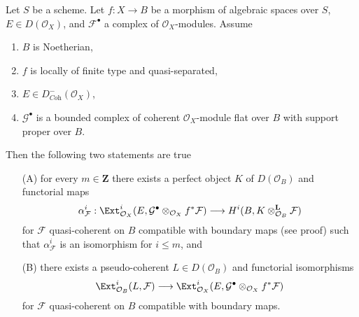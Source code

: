 \begin{lemma}
\label{lemma-compute-ext}
Let $S$ be a scheme. Let $f : X \to B$ be a morphism of algebraic spaces
over $S$, $E \in D(\mathcal{O}_X)$, and $\mathcal{F}^\bullet$ a complex
of $\mathcal{O}_X$-modules. Assume
\begin{enumerate}
\item $B$ is Noetherian,
\item $f$ is locally of finite type and quasi-separated,
\item $E \in D^-_{\textit{Coh}}(\mathcal{O}_X)$,
\item $\mathcal{G}^\bullet$ is a bounded complex of coherent
$\mathcal{O}_X$-module flat over $B$ with support proper over $B$.
\end{enumerate}
Then the following two statements are true
\begin{enumerate}
\item[(A)] for every $m \in \mathbf{Z}$ there exists a perfect object $K$
of $D(\mathcal{O}_B)$ and functorial maps
$$
\alpha^i_\mathcal{F} :
\Ext^i_{\mathcal{O}_X}(E,
\mathcal{G}^\bullet \otimes_{\mathcal{O}_X} f^*\mathcal{F})
\longrightarrow
H^i(B, K \otimes^\mathbf{L}_{\mathcal{O}_B} \mathcal{F})
$$
for $\mathcal{F}$ quasi-coherent on $B$
compatible with boundary maps (see proof)
such that $\alpha^i_\mathcal{F}$ is an isomorphism for $i \leq m$, and
\item[(B)] there exists a pseudo-coherent $L \in D(\mathcal{O}_B)$
and functorial isomorphisms
$$
\Ext^i_{\mathcal{O}_B}(L, \mathcal{F}) \longrightarrow
\Ext^i_{\mathcal{O}_X}(E,
\mathcal{G}^\bullet \otimes_{\mathcal{O}_X} f^*\mathcal{F})
$$
for $\mathcal{F}$ quasi-coherent on $B$ compatible with boundary maps.
\end{enumerate}
\end{lemma}

